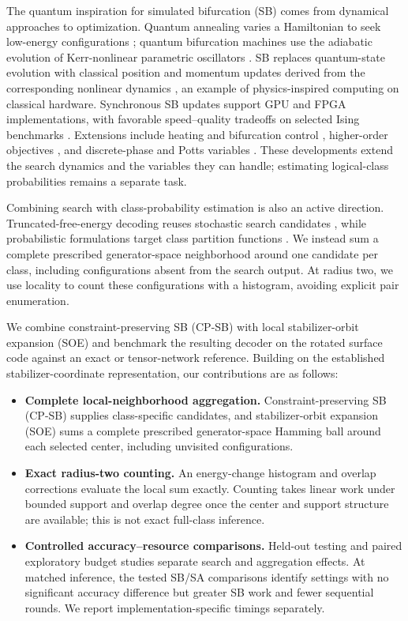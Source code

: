 \documentclass[aps,prapplied,reprint,superscriptaddress,amsmath,amssymb,floatfix,nofootinbib]{revtex4-2}
\newcommand{\tightlist}{\raggedright\setlength{\itemsep}{0pt}\setlength{\parskip}{0pt}}
\begin{document}
The quantum inspiration for simulated bifurcation (SB) comes from
dynamical approaches to optimization. Quantum annealing varies a
Hamiltonian to seek low-energy configurations \cite{ref18}; quantum
bifurcation machines use the adiabatic evolution of Kerr-nonlinear
parametric oscillators \cite{ref19}. SB replaces quantum-state evolution
with classical position and momentum updates derived from the
corresponding nonlinear dynamics \cite{ref20}, an example of
physics-inspired computing on classical hardware. Synchronous SB updates
support GPU \cite{ref20,ref21,ref22} and FPGA \cite{ref23,ref24,ref25} implementations, with
favorable speed--quality tradeoffs on selected Ising benchmarks
\cite{ref21,ref22}. Extensions include heating and bifurcation control
\cite{ref26,ref27}, higher-order objectives \cite{ref28}, and discrete-phase and
Potts variables \cite{ref29,ref30}. These developments extend the search
dynamics and the variables they can handle; estimating logical-class
probabilities remains a separate task.

Combining search with class-probability estimation is also an active
direction. Truncated-free-energy decoding reuses stochastic search
candidates \cite{ref31}, while probabilistic formulations target class
partition functions \cite{ref32}. We instead sum a complete prescribed
generator-space neighborhood around one candidate per class, including
configurations absent from the search output. At radius two, we use
locality to count these configurations with a histogram, avoiding
explicit pair enumeration.

We combine constraint-preserving SB (CP-SB) with local stabilizer-orbit
expansion (SOE) and benchmark the resulting decoder on the rotated
surface code against an exact or tensor-network reference. Building on
the established stabilizer-coordinate representation, our contributions
are as follows:

\begin{itemize}
\tightlist
\item
  \textbf{Complete local-neighborhood aggregation.}
  Constraint-preserving SB (CP-SB) supplies class-specific candidates,
  and stabilizer-orbit expansion (SOE) sums a complete prescribed
  generator-space Hamming ball around each selected center, including
  unvisited configurations.
\item
  \textbf{Exact radius-two counting.} An energy-change histogram and
  overlap corrections evaluate the local sum exactly. Counting takes
  linear work under bounded support and overlap degree once the center
  and support structure are available; this is not exact full-class
  inference.
\item
  \textbf{Controlled accuracy--resource comparisons.} Held-out testing
  and paired exploratory budget studies separate search and aggregation
  effects. At matched inference, the tested SB/SA comparisons identify
  settings with no significant accuracy difference but greater SB work
  and fewer sequential rounds. We report implementation-specific timings
  separately.
\end{itemize}
\end{document}
